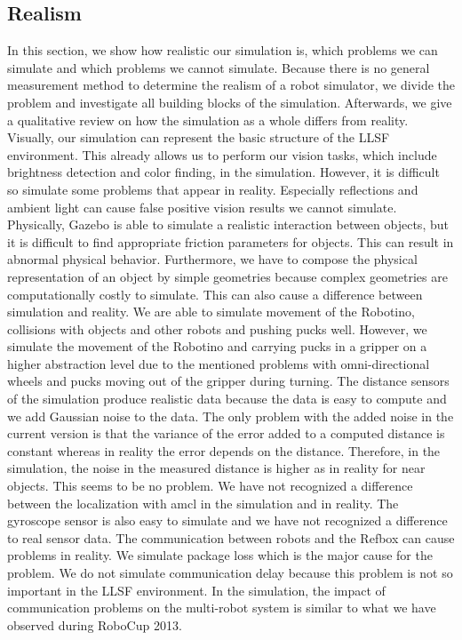 \subsection{Realism}
In this section, we show how realistic our simulation is, which problems we can simulate and which problems we cannot simulate. Because there is no general measurement method to determine the realism of a robot simulator, we divide the problem and investigate all building blocks of the simulation. Afterwards, we give a qualitative review on how the simulation as a whole differs from reality.\\
Visually, our simulation can represent the basic structure of the LLSF environment. This already allows us to perform our vision tasks, which include brightness detection and color finding, in the simulation. However, it is difficult so simulate some problems that appear in reality. Especially reflections and ambient light can cause false positive vision results we cannot simulate. Physically, Gazebo is able to simulate a realistic interaction between objects, but it is difficult to find appropriate friction parameters for objects. This can result in abnormal physical behavior. Furthermore, we have to compose the physical representation of an object by simple geometries because complex geometries are computationally costly to simulate. This can also cause a difference between simulation and reality. We are able to simulate movement of the Robotino, collisions with objects and other robots and pushing pucks well. However, we simulate the movement of the Robotino and carrying pucks in a gripper on a higher abstraction level due to the mentioned problems with omni-directional wheels and pucks moving out of the gripper during turning. The distance sensors of the simulation produce realistic data because the data is easy to compute and we add Gaussian noise to the data. The only problem with the added noise in the current version is that the variance of the error added to a computed distance is constant whereas in reality the error depends on the distance. Therefore, in the simulation, the noise in the measured distance is higher as in reality for near objects. This seems to be no problem. We have not recognized a difference between the localization with amcl in the simulation and in reality. The gyroscope sensor is also easy to simulate and we have not recognized a difference to real sensor data. The communication between robots and the Refbox can cause problems in reality. We simulate package loss which is the major cause for the problem. We do not simulate communication delay because this problem is not so important in the LLSF environment. In the simulation, the impact of communication problems on the multi-robot system is similar to what we have observed during RoboCup 2013.\\
